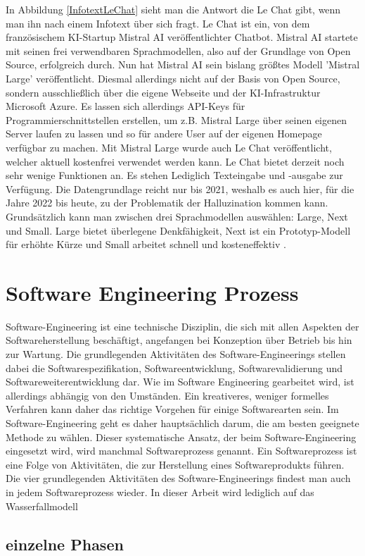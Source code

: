 In Abbildung \ref{InfotextLeChat} sieht man die Antwort die Le Chat gibt, wenn man ihn nach einem Infotext über sich 
fragt. Le Chat ist ein, von dem französischem KI-Startup Mistral AI veröffentlichter Chatbot. Mistral AI startete mit  
seinen frei verwendbaren Sprachmodellen, also auf der Grundlage von Open Source, erfolgreich durch. Nun  
hat Mistral AI sein bislang größtes Modell 'Mistral Large' veröffentlicht. Diesmal allerdings nicht auf der  
Basis von Open Source, sondern ausschließlich über die eigene Webseite und der KI-Infrastruktur Microsoft  
Azure. Es lassen sich allerdings API-Keys für Programmierschnittstellen erstellen, um z.B. Mistral Large über  
seinen eigenen Server laufen zu lassen und so für andere User auf der eigenen Homepage verfügbar zu machen.  
Mit Mistral Large wurde auch Le Chat veröffentlicht, welcher aktuell kostenfrei verwendet werden kann.
Le Chat bietet derzeit noch sehr wenige Funktionen an. Es stehen Lediglich Texteingabe und -ausgabe zur Verfügung.  
Die Datengrundlage reicht nur bis 2021, weshalb es auch hier, für die Jahre 2022 bis heute, zu der Problematik der  
Halluzination kommen kann.
Grundsätzlich kann man zwischen drei Sprachmodellen auswählen: Large, Next und Small. Large bietet überlegene Denkfähigkeit,  
Next ist ein Prototyp-Modell für erhöhte Kürze und Small arbeitet schnell und kosteneffektiv \cite{GrundlagenLeChat}.

\section{Software Engineering Prozess}

Software-Engineering ist eine technische Disziplin, die sich mit allen Aspekten der Softwareherstellung beschäftigt, 
angefangen bei Konzeption über Betrieb bis hin zur Wartung. Die grundlegenden Aktivitäten des Software-Engineerings stellen 
dabei die Softwarespezifikation, Softwareentwicklung, Softwarevalidierung und Softwareweiterentwicklung dar. Wie im 
Software Engineering gearbeitet wird, ist allerdings abhängig von den Umständen. Ein kreativeres, weniger formelles Verfahren 
kann daher das richtige Vorgehen für einige Softwarearten sein. Im Software-Engineering geht es daher hauptsächlich darum, 
die am besten geeignete Methode zu wählen. Dieser systematische Ansatz, der beim Software-Engineering eingesetzt wird, wird
manchmal Softwareprozess genannt. Ein Softwareprozess ist eine Folge von Aktivitäten, die zur Herstellung eines 
Softwareprodukts führen. Die vier grundlegenden Aktivitäten des Software-Engineerings findest man auch in jedem 
Softwareprozess wieder. In dieser Arbeit wird lediglich auf das Wasserfallmodell 

\subsection{einzelne Phasen}  \label{einzelne Phasen}
